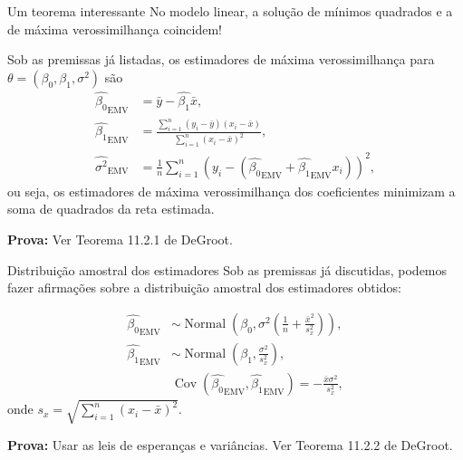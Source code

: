 \begin{frame}{Um teorema interessante}
No modelo linear, a solução de mínimos quadrados e a de máxima verossimilhança coincidem!
\begin{theo}
 Sob as premissas já listadas, os estimadores de máxima verossimilhança para $\theta = (\beta_0, \beta_1, \sigma^2)$ são
  \begin{align*}
  \hat{\beta_0}_{\text{EMV}} &= \bar{y} - \hat{\beta_1}\bar{x},\\
  \hat{\beta_1}_{\text{EMV}} &= \frac{\sum_{i=1}^n (y_i-\bar{y})(x_i-\bar{x})}{\sum_{i=1}^n \left(x_i - \bar{x}\right)^2},\\
  \hat{\sigma^2}_{\text{EMV}} & = \frac{1}{n} \sum_{i=1}^n \left(y_i - (  \hat{\beta_0}_{\text{EMV}} + \hat{\beta_1}_{\text{EMV}} x_i)\right)^2,  
 \end{align*}
 ou seja, os estimadores de máxima verossimilhança dos coeficientes minimizam a soma de quadrados da reta estimada.
\end{theo}
\textbf{Prova:} Ver Teorema 11.2.1 de DeGroot.
\end{frame}

\begin{frame}{Distribuição amostral dos estimadores}
Sob as premissas já discutidas, podemos fazer afirmações sobre a distribuição amostral dos estimadores obtidos:
\begin{theo}
   \begin{align*}
  \hat{\beta_0}_{\text{EMV}} &\sim \operatorname{Normal}\left(\beta_0, \sigma^2 \left( \frac{1}{n} + \frac{\bar{x}^2}{s_x^2} \right) \right),\\
  \hat{\beta_1}_{\text{EMV}}  &\sim \operatorname{Normal}\left(\beta_1, \frac{\sigma^2}{s_x^2}\right),\\
  &\operatorname{Cov}\left(\hat{\beta_0}_{\text{EMV}}, \hat{\beta_1}_{\text{EMV}} \right)  = -\frac{\bar{x}\sigma^2}{s_x^2},
 \end{align*}
 onde $s_x = \sqrt{\sum_{i=1}^n (x_i-\bar{x})^2}$.
\end{theo}
\textbf{Prova:} Usar as leis de esperanças e variâncias.
Ver Teorema 11.2.2 de DeGroot.
\end{frame}

